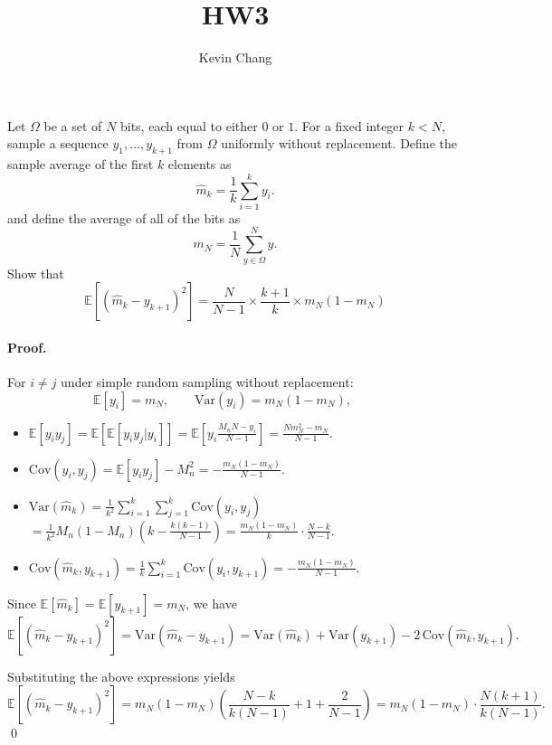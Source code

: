 \documentclass[a4paper]{article}
\title{HW3}
\author{Kevin Chang}
\begin{document}
\maketitle

\section{}
Let $\Omega$ be a set of $N$ bits, each equal to either $0$ or $1$.
For a fixed integer $k < N$, sample a sequence $y_1 , \dots , y_{k+1}$ from $\Omega$ uniformly without replacement.
Define the sample average of the first $k$ elements as
$$\hat{m}_k = \frac{1}{k} \sum_{i=1}^k y_i.$$
and define the average of all of the bits as
$$m_N = \frac{1}{N} \sum_{y\in\Omega}^N y.$$
Show that
$$\mathbb{E}[(\hat{m}_k - y_{k+1})^2] = \frac{N}{N-1} \times \frac{k+1}{k} \times m_N (1 - m_N)$$

\paragraph{Proof.}
For $i \neq j$ under simple random sampling without replacement:
\[
\mathbb{E}[y_i] = m_N, 
\qquad 
\mathrm{Var}(y_i) = m_N(1-m_N), 
\qquad 
\]
\begin{itemize}
    \item $\mathbb{E}[y_i y_j] = \mathbb{E}[\mathbb{E}[y_i y_j|y_i]] = \mathbb{E}[y_i \frac{M_n N - y_i}{N-1}] =\frac{N m_N^2 - m_N}{N-1}.$
    \item $\mathrm{Cov}(y_i,y_j) = \mathbb{E}[y_i y_j] - M_n^2 = -\frac{m_N(1-m_N)}{N-1}.$
    \item $\mathrm{Var}(\hat m_k) = \frac{1}{k^2}\sum_{i=1}^k \sum_{j=1}^k \mathrm{Cov}(y_i,y_j)$ 
        $= \frac{1}{k^2}M_n(1-M_n)(k - \frac{k(k-1)}{N-1}) = \frac{m_N(1-m_N)}{k}\cdot \frac{N-k}{N-1}.$
    \item $\mathrm{Cov}(\hat m_k, y_{k+1}) = \frac{1}{k}\sum_{i=1}^k \mathrm{Cov}(y_i, y_{k+1}) = -\frac{m_N(1-m_N)}{N-1}.$
\end{itemize}

Since $\mathbb{E}[\hat m_k] = \mathbb{E}[y_{k+1}] = m_N$, we have
\[
\mathbb{E}\!\left[(\hat m_k - y_{k+1})^2\right] 
= \mathrm{Var}(\hat m_k - y_{k+1})
= \mathrm{Var}(\hat m_k) + \mathrm{Var}(y_{k+1}) - 2\,\mathrm{Cov}(\hat m_k,y_{k+1}).
\]

Substituting the above expressions yields
\[
\mathbb{E}\!\left[(\hat m_k - y_{k+1})^2\right]
= m_N(1-m_N)\left(\frac{N-k}{k(N-1)} + 1 + \frac{2}{N-1}\right)
= m_N(1-m_N)\cdot \frac{N(k+1)}{k(N-1)}.
\]
\qed
\end{document}
